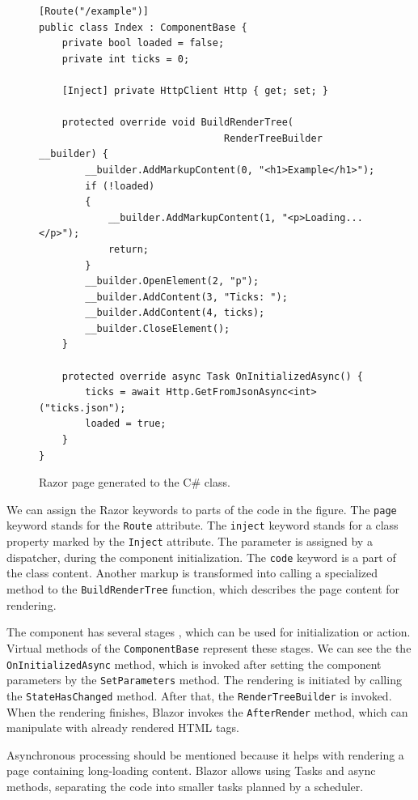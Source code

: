 \begin{figure}
\begin{lstlisting}
[Route("/example")]
public class Index : ComponentBase {
    private bool loaded = false;
    private int ticks = 0;
	
    [Inject] private HttpClient Http { get; set; }

    protected override void BuildRenderTree(
    							RenderTreeBuilder __builder) {
        __builder.AddMarkupContent(0, "<h1>Example</h1>");
        if (!loaded)
        {
            __builder.AddMarkupContent(1, "<p>Loading...</p>");
            return;
        }
        __builder.OpenElement(2, "p");
        __builder.AddContent(3, "Ticks: ");
        __builder.AddContent(4, ticks);
        __builder.CloseElement();
    }

    protected override async Task OnInitializedAsync() {
        ticks = await Http.GetFromJsonAsync<int>("ticks.json");
        loaded = true;
    }
}
\end{lstlisting}
\caption{Razor page generated to the C\# class.}
\label{img06:component}
\end{figure}
\par
We can assign the Razor keywords to parts of the code in the figure.
The \texttt{page} keyword stands for the \texttt{Route} attribute.
The \texttt{inject} keyword stands for a class property marked by the \texttt{Inject} attribute.
The parameter is assigned by a dispatcher, during the component initialization.
The \texttt{code} keyword is a part of the class content.
Another markup is transformed into calling a specialized method to the \texttt{BuildRenderTree} function, which describes the page content for rendering.
\par
The component has several stages \cite{online:lifecycle}, which can be used for initialization or action.
Virtual methods of the \texttt{ComponentBase} represent these stages.
We can see the the \texttt{OnInitializedAsync} method, which is invoked after setting the component parameters by the \texttt{SetParameters} method.
The rendering is initiated by calling the \texttt{StateHasChanged} method.
After that, the \texttt{RenderTreeBuilder} is invoked.
When the rendering finishes, Blazor invokes the \texttt{AfterRender} method, which can manipulate with already rendered HTML tags.
\par
Asynchronous processing should be mentioned because it helps with rendering a page containing long-loading content.
Blazor allows using Tasks and async methods, separating the code into smaller tasks planned by a scheduler.
